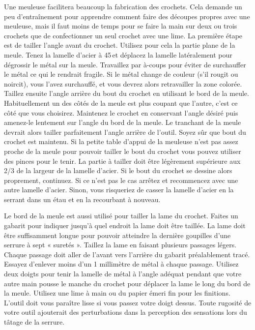 \documentclass[a4paper,french,11pt,twoside]{report}
\begin{document}
Une meuleuse facilitera beaucoup la fabrication des crochets. Cela demande un peu d'entraînement pour apprendre comment faire des découpes propres avec une meuleuse, mais il faut moins de temps pour se faire la main sur deux ou trois crochets que de confectionner un seul crochet avec une lime. La première étape est de tailler l'angle avant du crochet. Utilisez pour cela la partie plane de la meule. Tenez la lamelle d'acier à 45\textdegree{}\,et déplacez la lamelle latéralement pour dégrossir le métal sur la meule. Travaillez par à-coups pour éviter de surchauffer le métal ce qui le rendrait fragile. Si le métal change de couleur (s'il rougit ou noircit), vous l'avez surchauffé, et vous devrez alors retravailler la zone colorée. Taillez ensuite l'angle arrière du bout du crochet en utilisant le bord de la meule. Habituellement un des côtés de la meule est plus coupant que l'autre, c'est ce côté que vous choisirez. Maintenez le crochet en conservant l'angle désiré puis amenez-le lentement sur l'angle du bord de la meule. Le tranchant de la meule devrait alors tailler parfaitement l'angle arrière de l'outil. Soyez sûr que bout du crochet est maintenu. Si la petite table d'appui de la meuleuse n'est pas assez proche de la meule pour pouvoir tailler le bout du crochet vous pouvez utiliser des pinces pour le tenir. La partie à tailler doit être légèrement supérieure aux 2/3 de la largeur de la lamelle d'acier. Si le bout du crochet se dessine alors proprement, continuez. Si ce n'est pas le cas arrêtez et recommencez avec une autre lamelle d'acier. Sinon, vous risqueriez de casser la lamelle d'acier en la serrant dans un étau et en la recourbant à nouveau.

Le bord de la meule est aussi utilisé pour tailler la lame du crochet. Faites un gabarit pour indiquer jusqu'à quel endroit la lame doit être taillée. La lame doit être suffisamment longue pour pouvoir atteindre la dernière goupilles d'une serrure à sept « suretés ». Taillez la lame en faisant plusieurs passages légers. Chaque passage doit aller de l'avant vers l'arrière du gabarit préalablement tracé. Essayez d'enlever moins d'un 1 millimètre de métal à chaque passage. Utilisez deux doigts pour tenir la lamelle de métal à l'angle adéquat pendant que votre autre main pousse le manche du crochet pour déplacer la lame le long du bord de la meule.
Utilisez une lime à main ou du papier émeri fin pour les finitions. L'outil doit vous paraître lisse si vous passez votre doigt dessus. Toute rugosité de votre outil ajouterait des perturbations dans la perception des sensations lors du tâtage de la serrure.
\end{document}
